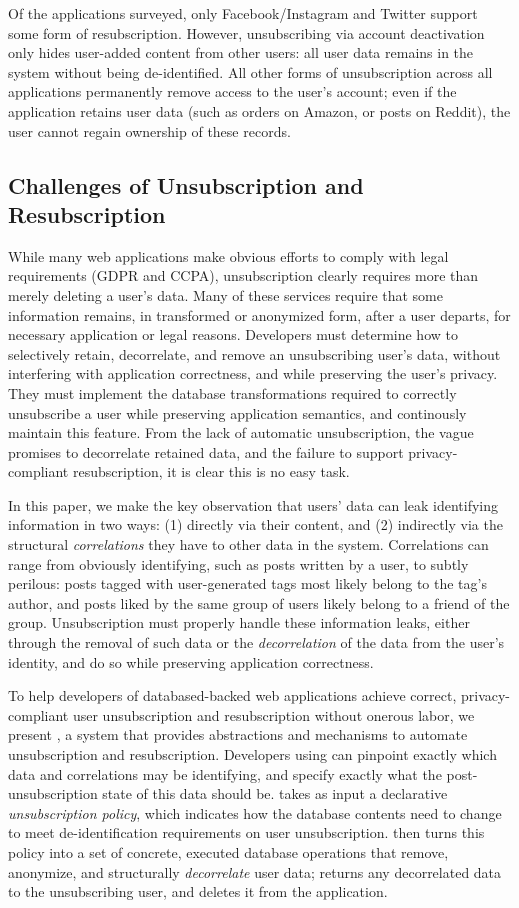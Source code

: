 Of the applications surveyed, only Facebook/Instagram and Twitter support some form of
resubscription. However, unsubscribing via account deactivation only hides user-added content from
other users: all user data remains in the system without being de-identified.  All other forms of
unsubscription across all applications permanently remove access to the user's account; even if the
application retains user data (such as orders on Amazon, or posts on Reddit), the user cannot regain
ownership of these records.

\subsection{Challenges of Unsubscription and Resubscription}
While many web applications make obvious efforts to comply with legal requirements (GDPR and CCPA),
unsubscription clearly requires more than merely deleting a user's data. Many of these services
require that some information remains, in transformed or anonymized form, after a user departs, for
necessary application or legal reasons. 
%
Developers must determine how to selectively retain, decorrelate, and remove an unsubscribing user's data,
without interfering with application correctness, and while preserving the user's privacy. They must 
implement the database transformations required to correctly unsubscribe a user while
preserving application semantics, and continously maintain this feature. 
%
From the lack of automatic unsubscription, the vague promises to decorrelate retained data, and the
failure to support privacy-compliant resubscription, it is clear this is no easy task.
%

In this paper, we make the key observation that users' data can leak identifying information
in two ways: (1) directly via their content, and (2) indirectly via the structural
\emph{correlations} they have to other data in the system. Correlations can range from obviously
identifying, such as posts written by a user, to subtly perilous: posts tagged with user-generated
tags most likely belong to the tag's author, and posts liked by the same group of users likely
belong to a friend of the group.
Unsubscription must properly handle these information leaks, either through the removal of such data or
the \emph{decorrelation} of the data from the user's identity, and do so while preserving
application correctness.

%
To help developers of databased-backed web applications achieve correct, privacy-compliant user
unsubscription and resubscription without onerous labor, we present \sys, a system that provides
abstractions and mechanisms to automate unsubscription and resubscription.
%
Developers using \sys can pinpoint exactly which data and correlations may be identifying, and
specify exactly what the post-unsubscription state of this data should be. \sys takes as input 
a declarative \emph{unsubscription policy}, which indicates how the database contents need
to change to meet de-identification requirements on user unsubscription.
%
\sys then turns this policy into a set of concrete, executed database operations that remove,
anonymize, and structurally \emph{decorrelate} user data; \sys returns any decorrelated data to the
unsubscribing user, and deletes it from the application.
%

